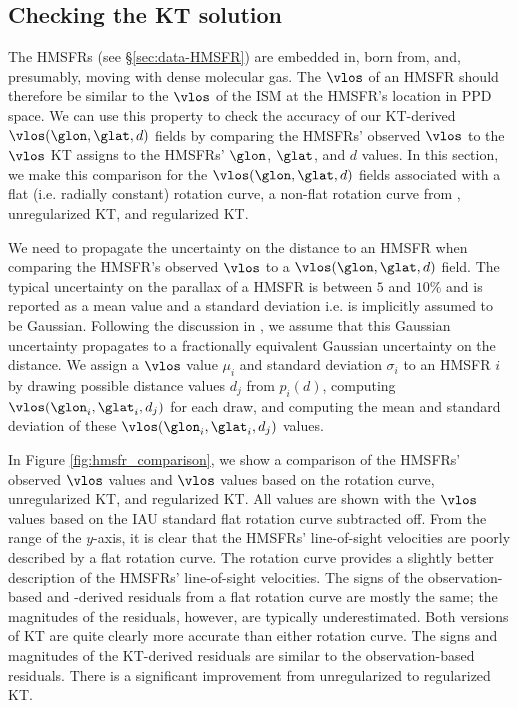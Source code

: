 \subsection{Checking the KT solution}
\label{sec:KT-validation}
The \Reid{} HMSFRs (see \S \ref{sec:data-HMSFR}) are embedded in, born from, and, presumably, moving with dense molecular gas.
The $\vlos$ of an HMSFR should therefore be similar to the $\vlos$ of the ISM at the HMSFR's location in PPD space.
We can use this property to check the accuracy of our KT-derived $\vlos(\glon, \glat, d)$ fields by comparing the HMSFRs' observed $\vlos$ to the $\vlos$ KT assigns to the HMSFRs' $\glon$, $\glat$, and $d$ values. 
In this section, we make this comparison for the $\vlos(\glon, \glat, d)$ fields associated with a flat (i.e. radially constant) rotation curve, a non-flat rotation curve from \citet{Clemens:1985dp}, unregularized KT, and regularized KT. 

We need to propagate the uncertainty on the distance to an HMSFR when comparing the HMSFR's observed $\vlos$ to a $\vlos(\glon, \glat, d)$ field.
The typical uncertainty on the parallax of a \Reid{} HMSFR is between $5$ and $10\%$ and is reported as a mean value and a standard deviation i.e. is implicitly assumed to be Gaussian. 
Following the discussion in \citet{2009ApJ...704.1704B}, we assume that this Gaussian uncertainty propagates to a fractionally equivalent Gaussian uncertainty on the distance.
We assign a $\vlos$ value $\mu_{i}$ and standard deviation $\sigma_{i}$ to an HMSFR $i$ by drawing possible distance values $d_j$ from $p_i(d)$, computing $\vlos(\glon_{i}, \glat_{i}, d_j)$ for each draw, and computing the mean and standard deviation of these $\vlos(\glon_{i}, \glat_{i}, d_j)$ values. 

In Figure \ref{fig:hmsfr_comparison}, we show a comparison of the HMSFRs' observed $\vlos$ values and $\vlos$ values based on the \citet{Clemens:1985dp} rotation curve, unregularized KT, and regularized KT.
All values are shown with the $\vlos$ values based on the IAU standard flat rotation curve subtracted off. 
From the range of the $y$-axis, it is clear that the HMSFRs' line-of-sight velocities are  poorly described by a flat rotation curve.
The \citet{Clemens:1985dp} rotation curve provides a slightly better description of the HMSFRs' line-of-sight velocities.
The signs of the observation-based and \citet{Clemens:1985dp}-derived residuals from a flat rotation curve are mostly the same; the magnitudes of the residuals, however, are typically underestimated.
Both versions of KT are quite clearly more accurate than either rotation curve.
The signs and magnitudes of the KT-derived residuals are similar to the observation-based residuals.
There is a significant improvement from unregularized to regularized KT.

